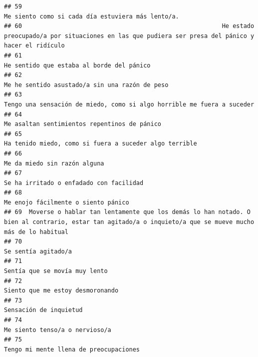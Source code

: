\documentclass[
]{article}
\begin{document}
\begin{verbatim}
## 59                                                                                                         Me siento como si cada día estuviera más lento/a.
## 60                                                        He estado preocupado/a por situaciones en las que pudiera ser presa del pánico y hacer el ridículo
## 61                                                                                                                 He sentido que estaba al borde del pánico
## 62                                                                                                            Me he sentido asustado/a sin una razón de peso
## 63                                                                                    Tengo una sensación de miedo, como si algo horrible me fuera a suceder
## 64                                                                                                              Me asaltan sentimientos repentinos de pánico
## 65                                                                                                    Ha tenido miedo, como si fuera a suceder algo terrible
## 66                                                                                                                              Me da miedo sin razón alguna
## 67                                                                                                                   Se ha irritado o enfadado con facilidad
## 68                                                                                                                       Me enojo fácilmente o siento pánico
## 69  Moverse o hablar tan lentamente que los demás lo han notado. O bien al contrario, estar tan agitado/a o inquieto/a que se mueve mucho más de lo habitual
## 70                                                                                                                                       Se sentía agitado/a
## 71                                                                                                                             Sentía que se movía muy lento
## 72                                                                                                                          Siento que me estoy desmoronando
## 73                                                                                                                                    Sensación de inquietud
## 74                                                                                                                            Me siento tenso/a o nervioso/a
## 75                                                                                                                    Tengo mi mente llena de preocupaciones

\end{verbatim}
\end{document}
